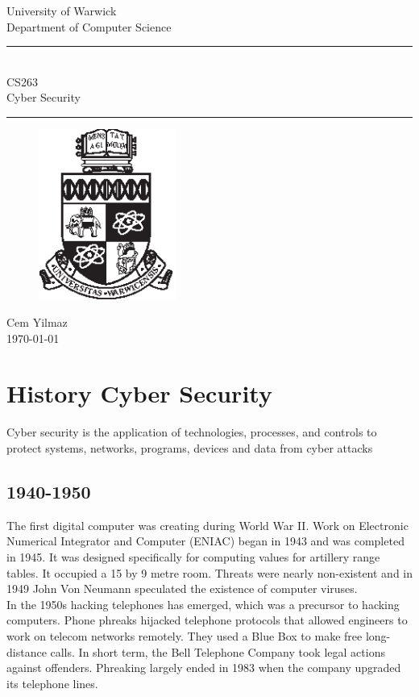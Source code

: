 \documentclass[a4paper]{article}
\theoremstyle{plain}
\theoremstyle{definition}
\newtheorem{defn}{Definition}[section]
\theoremstyle{remark}
\begin{document}
	\begin{titlepage}
	\begin{center}
	\large
	University of Warwick \\
	Department of Computer Science \\
	\huge
	\vspace{50mm}
	\rule{\linewidth}{0.5pt} \\
	CS263 \\
	\vspace{5mm}
	\Large
	Cyber Security
	\rule{\linewidth}{0.5pt}
	\vspace{5mm}
	\begin{figure}[H]
	\centering
	\includegraphics[width=0.4\textwidth]{crest_black.eps}
	\end{figure}
	\vspace{37mm}
	Cem Yilmaz \\
	\today
	\end{center}
	\end{titlepage}
	\tableofcontents
	\newpage
	\section{History Cyber Security}
	\begin{tcolorbox}[colback=black!3!white,colframe=black!60!white,title=\begin{defn}Cybersecurity \label{Cybersecurity}\end{defn}]
	Cyber security is the application of technologies, processes, and controls to protect systems, networks, programs, devices and data from cyber attacks
	\end{tcolorbox}
	\subsection{1940-1950}
	The first digital computer was creating during World War II. Work on Electronic Numerical Integrator and Computer (ENIAC) began in 1943 and was completed in 1945. It was designed specifically for computing values for artillery range tables. It occupied a 15 by 9 metre room. Threats were nearly non-existent and in 1949 John Von Neumann speculated the existence of computer viruses.  \\
	In the 1950s hacking telephones has emerged, which was a precursor to hacking computers. Phone phreaks hijacked telephone protocols that allowed engineers to work on telecom networks remotely. They used a Blue Box to make free long-distance calls. In short term, the Bell Telephone Company took legal actions against offenders. Phreaking largely ended in 1983 when the company upgraded its telephone lines. 
\end{document}
